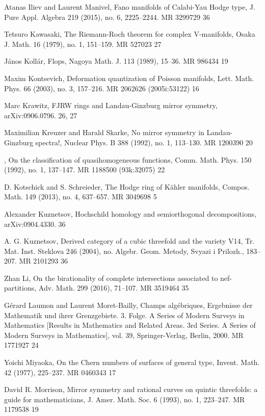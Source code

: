 {\begin{list}{}{%
  \setlength{\leftmargin}{3.8em}%
  \setlength{\itemindent}{-3.8em}%
  \setlength{\itemsep}{1.5pt}%
  \setlength{\parsep}{0pt}%
  \setlength{\listparindent}{0pt}%
}
\item[{[IM15]}] Atanas Iliev and Laurent Manivel, Fano manifolds of Calabi-Yau Hodge type, J. Pure Appl. Algebra 219 (2015), no. 6, 2225--2244. MR 3299729 36
\item[{[Kaw79]}] Tetsuro Kawasaki, The Riemann-Roch theorem for complex V-manifolds, Osaka J. Math. 16 (1979), no. 1, 151--159. MR 527023 27
\item[{[Kol89]}] János Kollár, Flops, Nagoya Math. J. 113 (1989), 15--36. MR 986434 19
\item[{[Kon03]}] Maxim Kontsevich, Deformation quantization of Poisson manifolds, Lett. Math. Phys. 66 (2003), no. 3, 157--216. MR 2062626 (2005i:53122) 16
\item[{[Kra]}] Marc Krawitz, FJRW rings and Landau-Ginzburg mirror symmetry, arXiv:0906.0796. 26, 27
\item[{[KS92a]}] Maximilian Kreuzer and Harald Skarke, No mirror symmetry in Landau-Ginzburg spectra!, Nuclear Phys. B 388 (1992), no. 1, 113--130. MR 1200390 20
\item[{[KS92b]}] , On the classification of quasihomogeneous functions, Comm. Math. Phys. 150 (1992), no. 1, 137--147. MR 1188500 (93k:32075) 22
\item[{[KS13]}] D. Kotschick and S. Schreieder, The Hodge ring of Kähler manifolds, Compos. Math. 149 (2013), no. 4, 637--657. MR 3049698 5
\item[{[Kuz]}] Alexander Kuznetsov, Hochschild homology and semiorthogonal decompositions, arXiv:0904.4330. 36
\item[{[Kuz04]}] A. G. Kuznetsov, Derived category of a cubic threefold and the variety V14, Tr. Mat. Inst. Steklova 246 (2004), no. Algebr. Geom. Metody, Svyazi i Prilozh., 183--207. MR 2101293 36
\item[{[Li16]}] Zhan Li, On the birationality of complete intersections associated to nef-partitions, Adv. Math. 299 (2016), 71--107. MR 3519464 35
\item[{[LMB00]}] Gérard Laumon and Laurent Moret-Bailly, Champs algébriques, Ergebnisse der Mathematik und ihrer Grenzgebiete. 3. Folge. A Series of Modern Surveys in Mathematics [Results in Mathematics and Related Areas. 3rd Series. A Series of Modern Surveys in Mathematics], vol. 39, Springer-Verlag, Berlin, 2000. MR 1771927 24
\item[{[Miy77]}] Yoichi Miyaoka, On the Chern numbers of surfaces of general type, Invent. Math. 42 (1977), 225--237. MR 0460343 17
\item[{[Mor93]}] David R. Morrison, Mirror symmetry and rational curves on quintic threefolds: a guide for mathematicians, J. Amer. Math. Soc. 6 (1993), no. 1, 223--247. MR 1179538 19

\end{list}}
